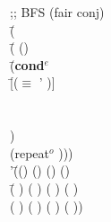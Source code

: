     \begin{ZZZZschemedisplay}%
;; BFS (fair conj)\\%
\va{$\gt$} \=(  \\%
  \>\PRN \HL \=( ()\\%
  \>  \>\PRN \HL \=(\textbf{cond$^e$}\\%
  \>  \>  \>\PRN \HL \=[($\equiv$ ' )]\\%
  \>  \>  \>  \>[($\equiv$ '\cn{b} \va{x})]\\%
  \>  \>  \>  \>[($\equiv$ '\cn{c} \va{x})]\\%
  \>  \>  \>  \>[($\equiv$ '\cn{d} \va{x})])\\%
  \>  \>  \>(repeat$^o$  )))\\%
'\=(() () () ()\\%
 \>\PRN \=( ) ( ) ( ) ( )\\%
 \> \>(  ) (  ) (  ) (  ))
\end{ZZZZschemedisplay}
	